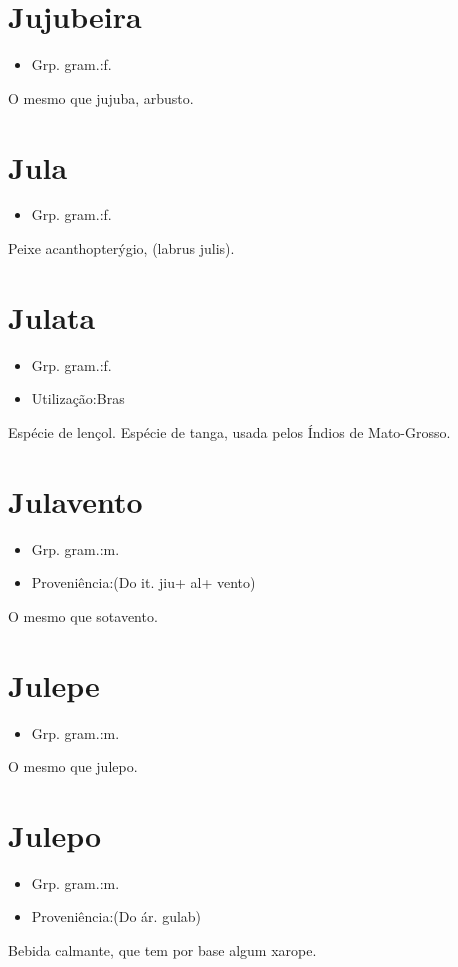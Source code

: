 \documentclass{article}
\begin{document}
\section{Jujubeira}
\begin{itemize}
\item {Grp. gram.:f.}
\end{itemize}
O mesmo que \textunderscore jujuba\textunderscore , arbusto.
\section{Jula}
\begin{itemize}
\item {Grp. gram.:f.}
\end{itemize}
Peixe acanthopterýgio, (\textunderscore labrus julis\textunderscore ).
\section{Julata}
\begin{itemize}
\item {Grp. gram.:f.}
\end{itemize}
\begin{itemize}
\item {Utilização:Bras}
\end{itemize}
Espécie de lençol.
Espécie de tanga, usada pelos Índios de Mato-Grosso.
\section{Julavento}
\begin{itemize}
\item {Grp. gram.:m.}
\end{itemize}
\begin{itemize}
\item {Proveniência:(Do it. \textunderscore jiu\textunderscore  + \textunderscore al\textunderscore  + \textunderscore vento\textunderscore )}
\end{itemize}
O mesmo que \textunderscore sotavento\textunderscore .
\section{Julepe}
\begin{itemize}
\item {Grp. gram.:m.}
\end{itemize}
O mesmo que \textunderscore julepo\textunderscore .
\section{Julepo}
\begin{itemize}
\item {Grp. gram.:m.}
\end{itemize}
\begin{itemize}
\item {Proveniência:(Do ár. \textunderscore gulab\textunderscore )}
\end{itemize}
Bebida calmante, que tem por base algum xarope.
\end{document}

